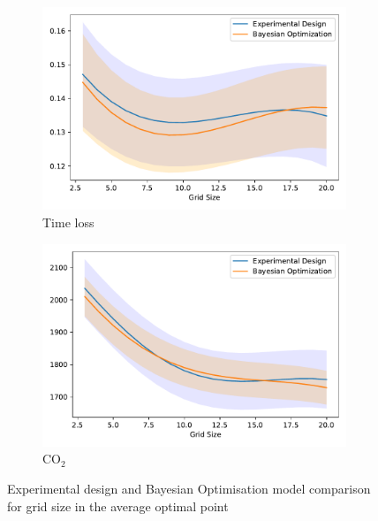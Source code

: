 \begin{figure}[t!]
\centering
\begin{subfigure}{0.5\textwidth}
  \centering
  \includegraphics[width=\textwidth]{images/ofat_compare/time/grid_size.pdf}
  \caption{Time loss}
\end{subfigure}%
\begin{subfigure}{0.5\textwidth}
  \centering
  \includegraphics[width=\textwidth]{images/ofat_compare/co2/grid_size.pdf}
  \caption{CO$_2$}
\end{subfigure}
\caption{Experimental design and Bayesian Optimisation model comparison for grid size in the average optimal point}
\label{fig:grid_size_comp}
\end{figure}

